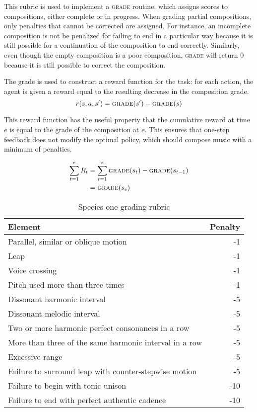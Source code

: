 \documentclass{article}
\begin{document}
    This rubric is used to implement a \textsc{grade} routine, which assigns scores to compositions, either complete or in progress. When grading partial compositions, only penalties that cannot be corrected are assigned. For instance, an incomplete composition is not be penalized for failing to end in a particular way because it is still possible for a continuation of the composition to end correctly. Similarly, even though the empty composition is a poor composition, \textsc{grade} will return 0 because it is still possible to correct the composition.
    
    The grade is used to construct a reward function for the task: for each action, the agent is given a reward equal to the resulting decrease in the composition grade. 
    \begin{equation}
    r(s,a,s') = \textsc{grade}(s') - \textsc{grade}(s)
    \end{equation}
    
    This reward function has the useful property that the cumulative reward at time $e$ is equal to the grade of the composition at $e$. This ensures that one-step feedback does not modify the optimal policy, which should compose music with a minimum of penalties. 
    
    \begin{align*}
    \sum_{t=1}^{e} R_t &= \sum_{t=1}^{e} \textsc{grade}(s_t) - \textsc{grade}(s_{t-1})\\
    &= \textsc{grade}(s_e)
    \end{align*}
    \begin{table}
        \begin{tabular}{p{6cm}r}
            \toprule
            Element & Penalty\\
            \midrule
            Parallel, similar or oblique motion & -1\\
            Leap & -1\\
            Voice crossing & -1\\
            Pitch used more than three times & -1\\
            Dissonant harmonic interval & -5\\
            Dissonant melodic interval & -5\\
            Two or more harmonic perfect consonances in a row & -5\\
            More than three of the same harmonic interval in a row & -5\\
            Excessive range & -5\\
            Failure to surround leap with counter-stepwise motion& -5\\
            Failure to begin with tonic unison & -10\\
            Failure to end with perfect authentic cadence & -10\\
            
            
            \bottomrule
        \end{tabular}
        \caption{Species one grading rubric}
    \end{table}
\end{document}
